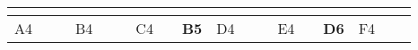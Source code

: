 \begin{landscape}
\begin{table}[h!]
\begin{tabular}{lcllcllcllcllcllcl}
                          & \multicolumn{1}{l}{}                                                                                                     &                              &                                                 & \multicolumn{1}{l}{}                                                                                                                                &                                                       &                         & \multicolumn{1}{l}{}                                                                                                     &                               &                                                 & \multicolumn{1}{l}{}                                                                                                                      &                                                       &                         & \multicolumn{1}{l}{}                                                                                                                &                               &                                                 & \multicolumn{1}{l}{}                                                                                                                                  &                                                       \\ \hline
\multicolumn{1}{|l|}{A4}  & \multicolumn{1}{c|}{}                                                                                                    & \multicolumn{1}{l|}{}        & \multicolumn{1}{l|}{\cellcolor[HTML]{C0C0C0}B4} & \multicolumn{1}{c|}{\cellcolor[HTML]{C0C0C0}}                                                                                                       & \multicolumn{1}{l|}{\cellcolor[HTML]{C0C0C0}{\bf A3}} & \multicolumn{1}{l|}{C4} & \multicolumn{1}{c|}{}                                                                                                    & \multicolumn{1}{l|}{{\bf B5}} & \multicolumn{1}{l|}{\cellcolor[HTML]{C0C0C0}D4} & \multicolumn{1}{c|}{\cellcolor[HTML]{C0C0C0}}                                                                                             & \multicolumn{1}{l|}{\cellcolor[HTML]{C0C0C0}{\bf B2}} & \multicolumn{1}{l|}{E4} & \multicolumn{1}{c|}{}                                                                                                               & \multicolumn{1}{l|}{{\bf D6}} & \multicolumn{1}{l|}{\cellcolor[HTML]{C0C0C0}F4} & \multicolumn{1}{c|}{\cellcolor[HTML]{C0C0C0}}                                                                                                         & \multicolumn{1}{l|}{\cellcolor[HTML]{C0C0C0}{\bf E1}} \\ \cline{1-1} \cline{3-4} \cline{6-7} \cline{9-10} \cline{12-13} \cline{15-16} \cline{18-18} 

\end{tabular}
\end{table}
\end{landscape}
